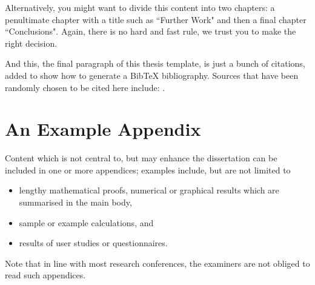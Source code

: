 \documentclass[ %
                    author={Daniel Page},
                supervisor={Dr. Andrew Calway},
                    degree={MSc},
                     title={Some Structural Guidelines for Data Science MSc Theses, Including Those With Long Titles that Run Across Multiple Lines on the Front Page},
                  subtitle={And those including an optional subtitle too, for good measure},
                      type={},
                      year={2021}]{dissertation}
\begin{document}
Alternatively, you might want to divide this content into two chapters: a penultimate chapter with a title such as ``Further Work" and then a final chapter ``Conclusions". Again, there is no hard and fast rule, we trust you to make the right decision. 

And this, the final paragraph of this thesis template, is just a bunch of citations, added to show how to generate a BibTeX bibliography. Sources that have been randomly chosen to be cited here include:
\cite{miller_etal_2018_clojure,webber_marwan_2015,touretzky_2013_lisp,eckmann_etal_1987,marwan_2011,vach_2015,shiller_2017,vytelingum_2006,tesfatsion_2002,rust_etal_1992}.





%
%

\backmatter





\appendix

\chapter{An Example Appendix}
\label{appx:example}

Content which is not central to, but may enhance the dissertation can be 
included in one or more appendices; examples include, but are not limited
to

\begin{itemize}
\item lengthy mathematical proofs, numerical or graphical results which 
      are summarised in the main body,
\item sample or example calculations, 
      and
\item results of user studies or questionnaires.
\end{itemize}

\noindent
Note that in line with most research conferences, the examiners are not
obliged to read such appendices.

\end{document}

